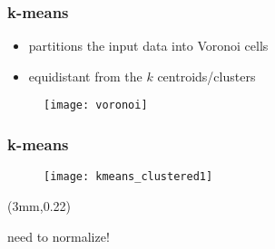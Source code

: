 \begin{frame}
\frametitle{k-means}

\begin{itemize}
	\setlength{\itemindent}{5em}
	\item partitions the input data into Voronoi cells
	\item equidistant from the $k$ centroids/clusters \cite{wiki:kmeans}
\end{itemize}

\begin{figure}
	\centering\texttt{[image: voronoi]}
\end{figure}

\end{frame}

\begin{frame}
\frametitle{k-means}

\begin{figure}
	\centering\texttt{[image: kmeans\_clustered1]}
\end{figure}

\begin{textblock*}{30mm}(3mm,0.22\textheight)
\begin{exampleblock}{}
	\color{Red}need to normalize!
\end{exampleblock}
\end{textblock*}

\end{frame}